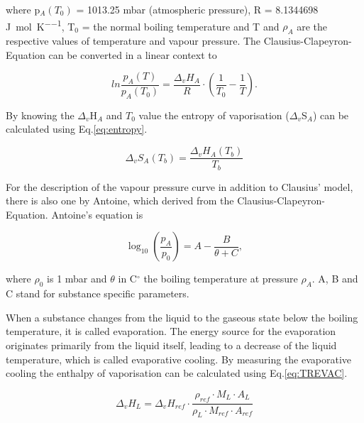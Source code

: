 \documentclass[a4paper,abstracton]{article}	                       %
\renewcommand{\cite}{\supercite}						%
\begin{document}
where p$_{\textit{A}}(T_{0})$ = 1013.25 mbar (atmospheric pressure), R = 8.1344698 \si{\joule\per\mol\per\kelvin}, T$_{0}$ = the normal boiling temperature and T and $\rho_{\textit{A}}$ are the respective values of temperature and vapour pressure. The Clausius-Clapeyron-Equation can be converted in a linear context to

\begin{equation}\label{eq:claus2}
   {ln\frac{p_{\textit{A}}(T)}{p_{\textit{A}}(T_{0})}} = \frac{\Delta_{\textit{v}}H_{A}}{R} \cdot (\frac{1}{T_{0}} - \frac{1}{T}).
\end{equation}

By knowing the $\Delta_{\textit{v}}$H$_{\textit{A}}$ and $T_{0}$ value the entropy of vaporisation ($\Delta_{\textit{v}}$S$_{\textit{A}}$) can be calculated using Eq.\ref{eq:entropy}.

\begin{equation}\label{eq:entropy}
   {\Delta_{\textit{v}}S_{\textit{A}}(T_{\textit{b}})} = \frac{\Delta_{\textit{v}}H_{\textit{A}}(T_{\textit{b}})}{T_{\textit{b}}}
\end{equation}

For the description of the vapour pressure curve in addition to Clausius' model, there is also one by Antoine, which derived from the Clausius-Clapeyron-Equation. Antoine's equation is

\begin{equation}\label{eq:antoine}
   {\log_{10}(\frac{p_{\textit{A}}}{p_{\textit{0}}})} = A - \frac{B}{\theta + C},
\end{equation}

where $\rho_{0}$ is 1 mbar and $\theta$ in C$^{\circ}$ the boiling temperature at pressure $\rho_{\textit{A}}$. A, B and C stand for substance specific parameters. 

When a substance changes from the liquid to the gaseous state below the boiling temperature, it is called evaporation. The energy source for the evaporation originates primarily from the liquid itself, leading to a decrease of the liquid temperature, which is called evaporative cooling\cite{meister}. By measuring the evaporative cooling the enthalpy of vaporisation can be calculated using Eq.\ref{eq:TREVAC}.

\begin{equation}\label{eq:TREVAC}
   {\Delta_{\textit{v}}H_{\textit{L}}} = \Delta_{\textit{v}}H_{\textit{ref}} \cdot  \frac{\rho_{\textit{ref}} \cdot M_{\textit{L}} \cdot A_{\textit{L}}}{\rho_{\textit{L}}\cdot M_{\textit{ref}} \cdot A_{\textit{ref}}}
\end{equation}
\end{document}
